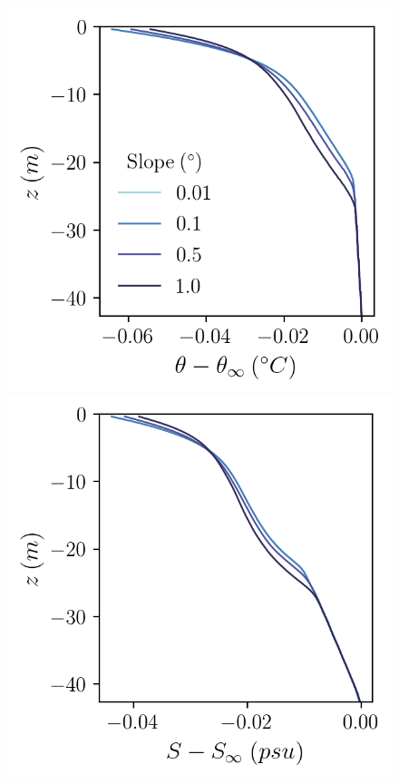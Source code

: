 \documentclass[draft]{agujournal2019}
\begin{document}
\begin{figure}[h!]
    \centering
    \begin{minipage}{0.33\textwidth}
        \includegraphics[trim={0 0cm 0 0},clip, width=\textwidth]{Figures/pt_cmp_dslope_43h_tav13h_z_profile.png}
    \end{minipage}%
    \begin{minipage}{0.33\textwidth}
        \includegraphics[trim={0 0cm 0 0},clip, width=\textwidth]{Figures/sa_cmp_dslope_43h_tav13h_z_profile.png}

\end{minipage}
\end{figure}
\end{document}
